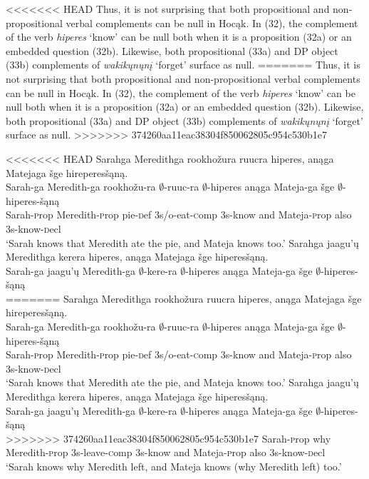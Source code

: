 \documentclass[output=paper]{LSP/langsci}
\begin{document}
<<<<<<< HEAD
Thus, it is not surprising that both propositional and non-propositional verbal complements can be null in Hocąk. In (32), the complement of the verb \emph{hiperes} `know' can be null both when it is a proposition (32a) or an embedded question (32b). Likewise, both propositional (33a) and DP object (33b) complements of \emph{wakikųnųnį} `forget' surface as null.
=======
Thus, it is not surprising that both propositional and non-propositional verbal complements can be null in Hoc\k{a}k. In (32), the complement of the verb \emph{hiperes} `know' can be null both when it is a proposition (32a) or an embedded question (32b). Likewise, both propositional (33a) and DP object (33b) complements of \emph{wakik\k{u}n\k{u}n\k{i}} `forget' surface as null.
>>>>>>> 374260aa11eac38304f850062805c954c530b1e7

\begin{exe}
\ex
\begin{xlist}
\ex
<<<<<<< HEAD
\glll Sarahga Meredithga rookhožura ruucra hiperes, anąga Matejaga šge hireperesšąną.\\
Sarah-ga Meredith-ga rookhožu-ra $\emptyset$-ruuc-ra $\emptyset$-hiperes anąga Mateja-ga šge $\emptyset$-hiperes-šąną\\
Sarah-{\textsc prop} Meredith-{\textsc prop} pie-{\textsc def} {\textsc 3s/o}-eat-{\textsc comp} {\textsc 3s}-know and Mateja-{\textsc prop} also {\textsc 3s}-know-{\textsc decl}\\
\trans `Sarah knows that Meredith ate the pie, and Mateja knows too.'
\ex
\glll Sarahga jaagu'ų Meredithga kerera hiperes, anąga Matejaga šge hiperesšąną.\\
Sarah-ga jaagu'ų Meredith-ga $\emptyset$-kere-ra $\emptyset$-hiperes anąga Mateja-ga šge $\emptyset$-hiperes-šąną\\
=======
\glll Sarahga Meredithga rookho\v{z}ura ruucra hiperes, an\k{a}ga Matejaga \v{s}ge hireperes\v{s}\k{a}n\k{a}.\\
Sarah-ga Meredith-ga rookho\v{z}u-ra $\emptyset$-ruuc-ra $\emptyset$-hiperes an\k{a}ga Mateja-ga \v{s}ge $\emptyset$-hiperes-\v{s}\k{a}n\k{a}\\
Sarah-{\textsc prop} Meredith-{\textsc prop} pie-{\textsc def} {\textsc 3s/o}-eat-{\textsc comp} {\textsc 3s}-know and Mateja-{\textsc prop} also {\textsc 3s}-know-{\textsc decl}\\
\trans `Sarah knows that Meredith ate the pie, and Mateja knows too.'
\ex
\glll Sarahga jaagu'\k{u} Meredithga kerera hiperes, an\k{a}ga Matejaga \v{s}ge hiperes\v{s}\k{a}n\k{a}.\\
Sarah-ga jaagu'\k{u} Meredith-ga $\emptyset$-kere-ra $\emptyset$-hiperes an\k{a}ga Mateja-ga \v{s}ge $\emptyset$-hiperes-\v{s}\k{a}n\k{a}\\
>>>>>>> 374260aa11eac38304f850062805c954c530b1e7
Sarah-{\textsc prop} why Meredith-{\textsc prop} {\textsc 3s}-leave-{\textsc comp} {\textsc 3s}-know and Mateja-{\textsc prop} also {\textsc 3s}-know-{\textsc decl}\\
\trans `Sarah knows why Meredith left, and Mateja knows (why Meredith left) too.'
\end{xlist}
\end{exe}
\end{document}
